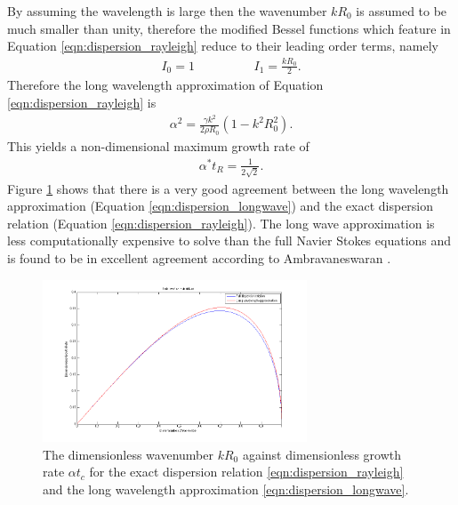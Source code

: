 \documentclass[11pt]{article}
\begin{document}
By assuming the wavelength is large then the wavenumber $kR_0$ is assumed to be much smaller than unity, therefore the modified Bessel functions which feature in Equation \ref{eqn:dispersion_rayleigh} reduce to their leading order terms, namely
\begin{align*}
I_0 = 1 \hspace{2cm} I_1 = \frac{kR_0}{2}.
\end{align*}
Therefore the long wavelength approximation of Equation \ref{eqn:dispersion_rayleigh} is
\begin{align}
\alpha^2 = \frac{\gamma k^2}{2 \rho R_0} (1 - k^2 R_0^2).
\label{eqn:dispersion_longwave}
\end{align}
This yields a non-dimensional maximum growth rate of 
\begin{align*}
\alpha^* t_R = \frac{1}{2 \sqrt{2}}.
\label{eqn:inviscid_max_growth}
\end{align*}
Figure \ref{fig:dispersion_compare} shows that there is a very good agreement between the long wavelength approximation (Equation \ref{eqn:dispersion_longwave}) and the exact dispersion relation (Equation \ref{eqn:dispersion_rayleigh}). The long wave approximation is less computationally expensive to solve than the full Navier Stokes equations and is found to be in excellent agreement according to Ambravaneswaran \cite{ambravaneswaran2002drop}.
\begin{figure}[h]
\begin{center}
	\includegraphics[width = 0.7\textwidth]{img/dispersion_comparison.png}
	\caption{The dimensionless wavenumber $kR_0$ against dimensionless growth rate $\alpha t_c$ for the exact dispersion relation \ref{eqn:dispersion_rayleigh} and the long wavelength approximation \ref{eqn:dispersion_longwave}.}
	\label{fig:dispersion_compare}
\end{center}
\end{figure} 
\end{document}
